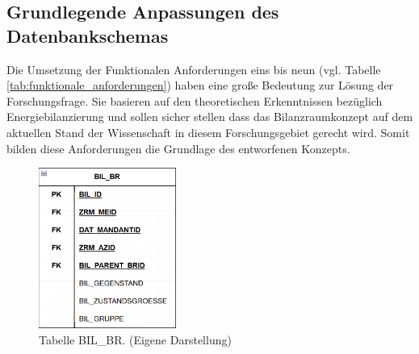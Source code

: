 \subsection{Grundlegende Anpassungen des Datenbankschemas}
Die Umsetzung der Funktionalen Anforderungen eins bis neun (vgl. Tabelle \eqref{tab:funktionale_anforderungen}) haben eine große Bedeutung zur Lösung 
der Forschungsfrage. 
Sie basieren auf den theoretischen Erkenntnissen bezüglich Energiebilanzierung und sollen sicher stellen dass das Bilanzraumkonzept auf dem aktuellen Stand der Wissenschaft 
in diesem Forschungsgebiet gerecht wird.
Somit bilden diese Anforderungen die Grundlage des entworfenen Konzepts.

\begin{figure}[H]
    \centering
    \includegraphics[width=0.4\textwidth]{../../Ressourcen/Abbildungen/Konzept/BIL_BR.png}
    \caption{Tabelle BIL\_BR. (Eigene Darstellung)}
    \label{fig:BIL_BR}
\end{figure}

